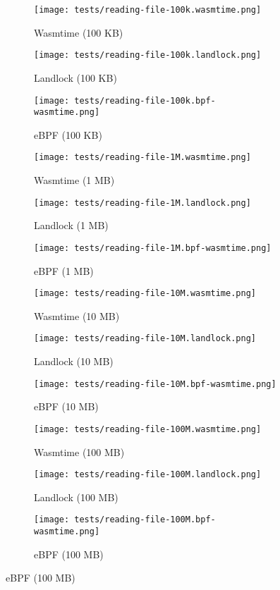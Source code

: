 \begin{figure}[ht!]
  \centering
  \begin{subfigure}[b]{0.32\textwidth}
    \centering
    \texttt{[image: tests/reading-file-100k.wasmtime.png]}
    \caption{Wasmtime (100 KB)}
  \end{subfigure}
  \begin{subfigure}[b]{0.32\textwidth}
    \centering
    \texttt{[image: tests/reading-file-100k.landlock.png]}
    \caption{Landlock (100 KB)}
  \end{subfigure}
  \begin{subfigure}[b]{0.32\textwidth}
    \centering
    \texttt{[image: tests/reading-file-100k.bpf-wasmtime.png]}
    \caption{eBPF (100 KB)}
  \end{subfigure}

  \begin{subfigure}[b]{0.32\textwidth}
    \centering
    \texttt{[image: tests/reading-file-1M.wasmtime.png]}
    \caption{Wasmtime (1 MB)}
  \end{subfigure}
  \begin{subfigure}[b]{0.32\textwidth}
    \centering
    \texttt{[image: tests/reading-file-1M.landlock.png]}
    \caption{Landlock (1 MB)}
  \end{subfigure}
  \begin{subfigure}[b]{0.32\textwidth}
    \centering
    \texttt{[image: tests/reading-file-1M.bpf-wasmtime.png]}
    \caption{eBPF (1 MB)}
  \end{subfigure}

  \begin{subfigure}[b]{0.32\textwidth}
    \centering
    \texttt{[image: tests/reading-file-10M.wasmtime.png]}
    \caption{Wasmtime (10 MB)}
  \end{subfigure}
  \begin{subfigure}[b]{0.32\textwidth}
    \centering
    \texttt{[image: tests/reading-file-10M.landlock.png]}
    \caption{Landlock (10 MB)}
  \end{subfigure}
  \begin{subfigure}[b]{0.32\textwidth}
    \centering
    \texttt{[image: tests/reading-file-10M.bpf-wasmtime.png]}
    \caption{eBPF (10 MB)}
  \end{subfigure}

  \begin{subfigure}[b]{0.32\textwidth}
    \centering
    \texttt{[image: tests/reading-file-100M.wasmtime.png]}
    \caption{Wasmtime (100 MB)}
  \end{subfigure}
  \begin{subfigure}[b]{0.32\textwidth}
    \centering
    \texttt{[image: tests/reading-file-100M.landlock.png]}
    \caption{Landlock (100 MB)}
  \end{subfigure}
  \begin{subfigure}[b]{0.32\textwidth}
    \centering
    \texttt{[image: tests/reading-file-100M.bpf-wasmtime.png]}
    \caption{eBPF (100 MB)}
  \end{subfigure}


\end{figure}
